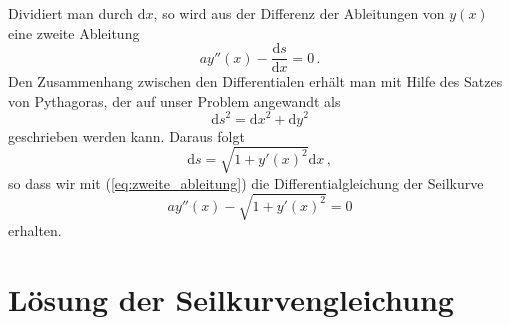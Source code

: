\documentclass[twocolumn,aps]{revtex4}
\begin{document}
Dividiert man durch $\mathrm{d}x$, so wird aus der Differenz der
Ableitungen von $y(x)$ eine zweite Ableitung
\begin{equation}
 ay''(x)-\frac{\mathrm{d}s}{\mathrm{d}x} = 0\,.
 \label{eq:zweite_ableitung}
\end{equation}
Den Zusammenhang zwischen den Differentialen erhält man mit Hilfe des
Satzes von Pythagoras, der auf unser Problem angewandt als
\begin{equation}
 \mathrm{d}s^2 = \mathrm{d}x^2+\mathrm{d}y^2
\end{equation}
geschrieben werden kann. Daraus folgt
\begin{equation}
 \mathrm{d}s = \sqrt{1+y'(x)^2}\mathrm{d}x\,,
\end{equation}
so dass wir mit (\ref{eq:zweite_ableitung}) die Differentialgleichung
der Seilkurve
\begin{equation}
 ay''(x)-\sqrt{1+y'(x)^2} = 0
\end{equation}
erhalten.

\section{Lösung der Seilkurvengleichung}
\end{document}
